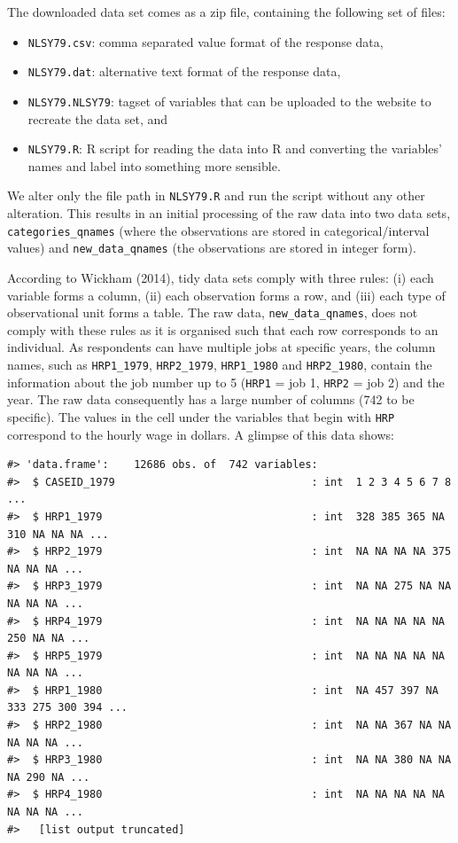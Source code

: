 \documentclass{article}
\providecommand{\tightlist}{%
  \setlength{\itemsep}{0pt}\setlength{\parskip}{0pt}}
\begin{document}
The downloaded data set comes as a zip file, containing the following set of files:

\begin{itemize}
\tightlist
\item
  \texttt{NLSY79.csv}: comma separated value format of the response data,
\item
  \texttt{NLSY79.dat}: alternative text format of the response data,
\item
  \texttt{NLSY79.NLSY79}: tagset of variables that can be uploaded to the website to recreate the data set, and
\item
  \texttt{NLSY79.R}: R script for reading the data into R and converting the variables' names and label into something more sensible.
\end{itemize}

We alter only the file path in \texttt{NLSY79.R} and run the script without any other alteration. This results in an initial processing of the raw data into two data sets, \texttt{categories\_qnames} (where the observations are stored in categorical/interval values) and \texttt{new\_data\_qnames} (the observations are stored in integer form).

According to Wickham (2014), tidy data sets comply with three rules: (i) each variable forms a column, (ii) each observation forms a row, and (iii) each type of observational unit forms a table. The raw data, \texttt{new\_data\_qnames}, does not comply with these rules as it is organised such that each row corresponds to an individual. As respondents can have multiple jobs at specific years, the column names, such as \texttt{HRP1\_1979}, \texttt{HRP2\_1979}, \texttt{HRP1\_1980} and \texttt{HRP2\_1980}, contain the information about the job number up to 5 (\texttt{HRP1} = job 1, \texttt{HRP2} = job 2) and the year. The raw data consequently has a large number of columns (742 to be specific). The values in the cell under the variables that begin with \texttt{HRP} correspond to the hourly wage in dollars. A glimpse of this data shows:

\begin{verbatim}
#> 'data.frame':    12686 obs. of  742 variables:
#>  $ CASEID_1979                               : int  1 2 3 4 5 6 7 8 ...
#>  $ HRP1_1979                                 : int  328 385 365 NA 310 NA NA NA ...
#>  $ HRP2_1979                                 : int  NA NA NA NA 375 NA NA NA ...
#>  $ HRP3_1979                                 : int  NA NA 275 NA NA NA NA NA ...
#>  $ HRP4_1979                                 : int  NA NA NA NA NA 250 NA NA ...
#>  $ HRP5_1979                                 : int  NA NA NA NA NA NA NA NA ...
#>  $ HRP1_1980                                 : int  NA 457 397 NA 333 275 300 394 ...
#>  $ HRP2_1980                                 : int  NA NA 367 NA NA NA NA NA ...
#>  $ HRP3_1980                                 : int  NA NA 380 NA NA NA 290 NA ...
#>  $ HRP4_1980                                 : int  NA NA NA NA NA NA NA NA ...
#>   [list output truncated]
\end{verbatim}
\end{document}
